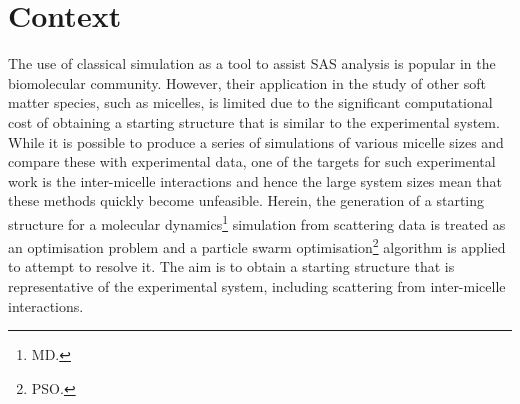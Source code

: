 \section*{Context}
The use of classical simulation as a tool to assist SAS analysis is popular in the biomolecular community.
However, their application in the study of other soft matter species, such as micelles, is limited due to the significant computational cost of obtaining a starting structure that is similar to the experimental system.
While it is possible to produce a series of simulations of various micelle sizes and compare these with experimental data, one of the targets for such experimental work is the inter-micelle interactions and hence the large system sizes mean that these methods quickly become unfeasible.
Herein, the generation of a starting structure for a molecular dynamics\footnote{MD.} simulation from scattering data is treated as an optimisation problem and a particle swarm optimisation\footnote{PSO.} algorithm is applied to attempt to resolve it.
The aim is to obtain a starting structure that is representative of the experimental system, including scattering from inter-micelle interactions.
